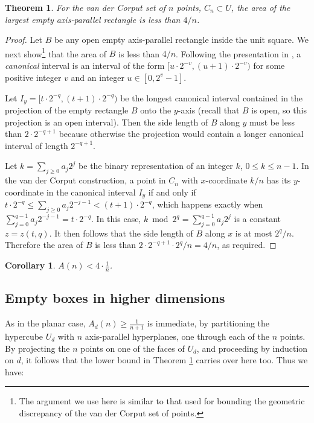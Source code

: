 \documentclass[11pt]{article}
\newtheorem{theorem}{Theorem}
\newtheorem{corollary}{Corollary}
\begin{document}
\begin{theorem} \label{T1}
For the van der Corput set of $n$ points, $C_n \subset U$, the area of
the largest empty axis-parallel rectangle is less than $4/n$.
\end{theorem}
\begin{proof}
Let $B$ be any open empty axis-parallel rectangle inside the unit square.
We next show\footnote{The argument we use here is similar to
that used for bounding the geometric discrepancy of the van der Corput
set of points.} that the area of $B$ is less than $4/n$. 
Following the presentation in \cite[p.~39]{Ma99},
a \emph{canonical} interval is an interval of the form
$[u \cdot 2^{-v}, (u+1) \cdot 2^{-v})$
for some positive integer $v$ and an integer $u \in [0, 2^v -1]$.

Let $I_y = [t \cdot 2^{-q}, (t+1) \cdot 2^{-q})$
be the longest canonical interval
contained in the projection of the empty rectangle $B$ onto the $y$-axis
(recall that $B$ is open, so this projection is an open interval).
Then the side length of $B$ along $y$ must be less than
$2 \cdot 2^{-q+1}$ because otherwise the projection would
contain a longer canonical interval of length $2^{-q+1}$.

Let $k=\sum_{j \ge 0} a_j 2^j$ be the binary representation of
an integer $k$, $0 \le k \le n - 1$.
In the van der Corput construction,
a point in $C_n$ with $x$-coordinate $k/n$
has its $y$-coordinate in the canonical interval $I_y$ if and only if
$t \cdot 2^{-q} \le \sum_{j\ge 0} a_j 2^{-j-1} < (t+1) \cdot 2^{-q}$,
which happens exactly when
$\sum_{j=0}^{q-1} a_j 2^{-j-1} = t \cdot 2^{-q}$.
In this case, $k \bmod 2^q = \sum_{j=0}^{q-1} a_j 2^j$ is a constant
$z= z(t, q)$.
It then follows that the side length of $B$ along $x$
is at most $2^q / n$.
Therefore the area of $B$ is less than
$2 \cdot 2^{-q+1} \cdot 2^q / n =4/n$, as required.
\end{proof}

\begin{corollary} \label{C1}
$A(n) < 4\cdot \frac{1}{n}$.
\end{corollary} 


\subsection{Empty boxes in higher dimensions}\label{subsec:higher}

As in the planar case, $A_d(n) \geq \frac{1}{n+1}$ is immediate,
by partitioning the hypercube $U_d$ with $n$ axis-parallel hyperplanes,
one through each of the $n$ points. 
By projecting the $n$ points on one of the faces of $U_d$,
and proceeding by induction on $d$, it follows that the lower bound in
Theorem \ref{T1} carries over here too. 
Thus we have:
\end{document}
